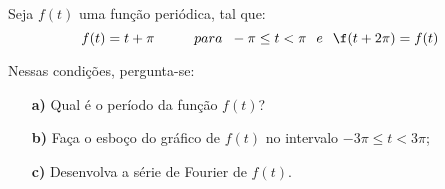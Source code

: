 \linespread{1.5}
Seja $f(t)$ uma função periódica, tal que:
\begin{equation*}
    f(t) = t+\pi \hspace{1cm} para \hspace{0.2cm} -\pi \leq t < \pi \hspace{0.25cm} e  \hspace{0.25cm} \f(t+2\pi) = f(t)
\end{equation*}

Nessas condições, pergunta-se:
\begin{itemize}
    \item[\textbf{a)}] Qual é o período da função $f(t)$?
    \item[\textbf{b)}] Faça o esboço do gráfico de $f(t)$ no intervalo $-3\pi \leq t < 3\pi$;
    \item[\textbf{c)}] Desenvolva a série de Fourier de $f(t)$.
\end{itemize}